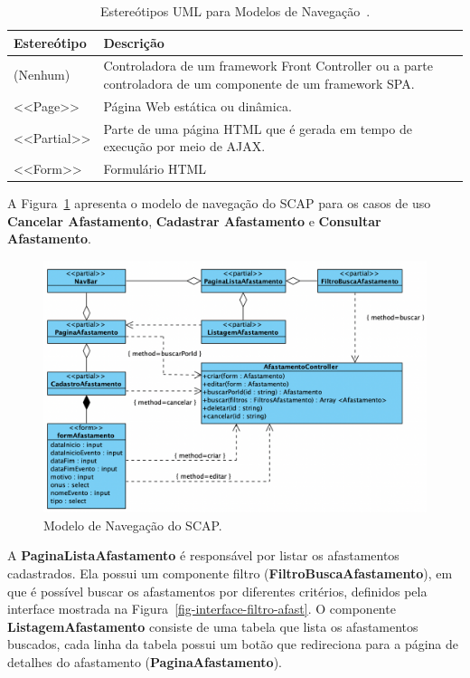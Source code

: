 \begin{table}[h!]
    \centering
    \caption{Estereótipos UML para Modelos de Navegação~\cite{hoppe:2023}.}
    \label{tab-estereotipos-navegacao}
    \begin{tabular}{|p{3cm}|p{12cm}|}
        \hline
        \textbf{Estereótipo} & \textbf{Descrição} \\
        \hline
        (Nenhum)    & Controladora de um framework Front Controller ou a parte controladora de um componente de um framework SPA. \\
        \hline
        <<Page>>    & Página Web estática ou dinâmica. \\
        \hline
        <<Partial>> & Parte de uma página HTML que é gerada em tempo de execução por meio de AJAX. \\
        \hline
        <<Form>>    & Formulário HTML \\
        \hline
    \end{tabular}
\end{table}

A Figura~\ref{fig-modelo-navegacao-afast} apresenta o modelo de navegação do SCAP para os casos de uso
\textbf{Cancelar Afastamento}, \textbf{Cadastrar Afastamento} e \textbf{Consultar Afastamento}.

\begin{figure}
    \centering
    \includegraphics[width=1\textwidth]{figuras/fig-modelo-naveg-afast.png}
    \caption{Modelo de Navegação do SCAP.}
    \label{fig-modelo-navegacao-afast}
\end{figure}

A \textbf{PaginaListaAfastamento} é responsável por listar os afastamentos cadastrados.
Ela possui um componente filtro (\textbf{FiltroBuscaAfastamento}), em que é possível buscar
os afastamentos por diferentes critérios, definidos pela interface mostrada na Figura~\ref{fig-interface-filtro-afast}.
O componente \textbf{ListagemAfastamento} consiste de uma tabela que lista os afastamentos buscados,
cada linha da tabela possui um botão que redireciona para a página de detalhes do afastamento (\textbf{PaginaAfastamento}).


